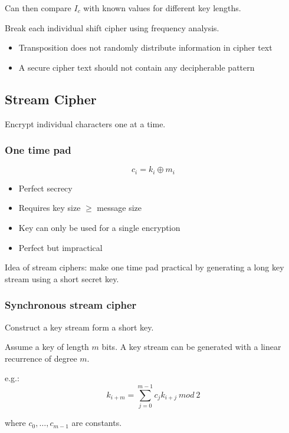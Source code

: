 \documentclass[a4paper]{article}
\begin{document}
Can then compare $I_{c}$ with known values for different key lengths.


Break each individual shift cipher using frequency analysis.


\begin{itemize}
  \item Transposition does not randomly distribute information in cipher text
  \item A secure cipher text should not contain any decipherable pattern
\end{itemize}

\subsection{Stream Cipher}

Encrypt individual characters one at a time.

\subsubsection{One time pad}
\label{sec:one_time_pad}

\[
  c_{i} = k_{i} \oplus m_{i}
\]

\begin{itemize}
  \item Perfect secrecy
  \item Requires key size $\geq$ message size
  \item Key can only be used for a single encryption
  \item Perfect but impractical
\end{itemize}

Idea of stream ciphers: make one time pad practical by generating a long key
stream using a short secret key.

\subsubsection{Synchronous stream cipher}

Construct a key stream form a short key.

Assume a key of length $m$ bits. A key stream can be generated with a linear
recurrence of degree $m$.

e.g.:
\[
  k_{i+m} = \sum^{m-1}_{j=0} c_{j}k_{i+j} \: mod \: 2
\]

where $c_{0}, \ldots, c_{m-1}$ are constants.
\end{document}
